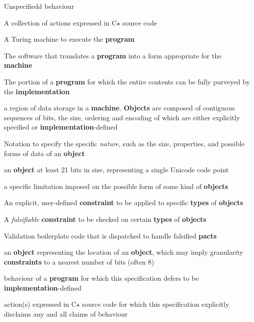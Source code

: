 \documentclass[12pt,english]{article}
\begin{document}
\begin{labeling}{Unspecifiedd behaviour}
\item [\textbf{Program}] A collection of actions expressed in C$\star$ source
code
\item [\textbf{Machine}] A Turing machine to execute the \textbf{program}
\item [\textbf{Implementation}] The software that translates a
\textbf{program} into a form appropriate for the \textbf{machine}
\item [\textbf{Total system}] The portion of a \textbf{program} for which the
entire contents can be fully purveyed by the \textbf{implementation}
\item [\textbf{Object}] a region of data storage in a \textbf{machine}.
\textbf{Objects} are composed of contiguous sequences of bits,
the size, ordering and encoding of which are either explicitly specified or
\textbf{implementation}-defined
\item [\textbf{Type}] Notation to specify the specific \textit{nature}, such
as the size, properties, and possible forms of data of an \textbf{object}
\item [\textbf{Rune}] an \textbf{object} at least 21 bits in size,
representing a single Unicode code point
\item [\textbf{Constraint}] a specific limitation imposed on the possible form
of some kind of \textbf{objects}
\item [\textbf{Law}] An explicit, user-defined \textbf{constraint} to be
applied to specific \textbf{types} of \textbf{objects}
\item [\textbf{Pact}] A \textit{falsifiable} \textbf{constraint} to be checked
on certain \textbf{types} of \textbf{objects}
\item [\textbf{Marshal}] Validation boilerplate code that is dispatched to
handle falsified \textbf{pacts}
\item [\textbf{Address}] an \textbf{object} representing the location of an
\textbf{object}, which may imply granularity \textbf{constraints} to a nearest
number of bits (often 8)
\item [\textbf{Unspecified behaviour}] behaviour of a \textbf{program} for
which this specification defers to be \textbf{implementation}-defined
\item [\textbf{Undefined behaviour}] action(s) expressed in C$\star$ source
code for which this specification explicitly disclaims any and all claims of
behaviour
\end{labeling}
\end{document}
